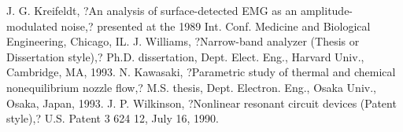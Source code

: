\documentclass[letterpaper, 10 pt, conference]{ieeeconf}  %
\begin{document}
\begin{thebibliography}{99}
 J. G. Kreifeldt, ?An analysis of surface-detected EMG as an amplitude-modulated noise,? presented at the 1989 Int. Conf. Medicine and Biological Engineering, Chicago, IL.
 J. Williams, ?Narrow-band analyzer (Thesis or Dissertation style),? Ph.D. dissertation, Dept. Elect. Eng., Harvard Univ., Cambridge, MA, 1993. 
 N. Kawasaki, ?Parametric study of thermal and chemical nonequilibrium nozzle flow,? M.S. thesis, Dept. Electron. Eng., Osaka Univ., Osaka, Japan, 1993.
 J. P. Wilkinson, ?Nonlinear resonant circuit devices (Patent style),? U.S. Patent 3 624 12, July 16, 1990. 






\end{thebibliography}
\end{document}
